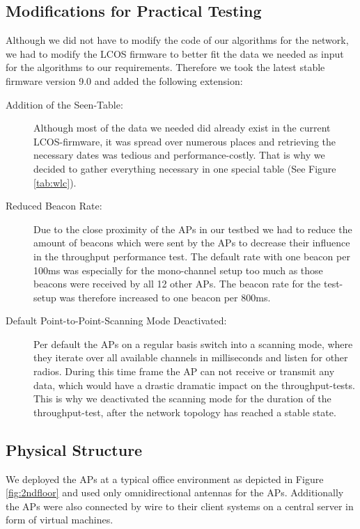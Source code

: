     \subsection{Modifications for Practical Testing}
      Although we did not have to modify the code of our algorithms for the network, we had to modify the \ac{LCOS} firmware to better fit the 
      data we needed as input for the algorithms to our requirements. Therefore we took the latest stable firmware version 9.0 and added the following extension:
      \begin{description}
	\item[Addition of the Seen-Table:]
	  Although most of the data we needed did already exist in the current \ac{LCOS}-firmware, it was spread over numerous places and retrieving the necessary dates
	  was tedious and performance-costly. That is why we decided to gather everything necessary in one special table (See Figure \ref{tab:wlc}).
	\item[Reduced Beacon Rate:]
	  Due to the close proximity of the APs in our testbed we had to reduce the amount of beacons which were sent by the APs to decrease their influence in 
	  the throughput performance test. The default rate with one beacon per 100ms was especially for the mono-channel setup too much as those beacons were received
	  by all 12 other APs. The beacon rate for the test-setup was therefore increased to one beacon per 800ms.
	\item[Default Point-to-Point-Scanning Mode Deactivated:]
	  Per default the APs on a regular basis switch into a scanning mode, where they iterate over all available channels in milliseconds and listen for
	  other radios. During this time frame the AP can not receive or transmit any data, which would have a drastic dramatic impact on the throughput-tests.
	  This is why we deactivated the scanning mode for the duration of the throughput-test, after the network topology has reached a stable state.
      \end{description}
   
\newpage
   
    \subsection{Physical Structure}
      We deployed the APs at a typical office environment as depicted in Figure \ref{fig:2ndfloor} and used only omnidirectional antennas for the APs.
      Additionally the APs were also connected by wire to their client systems on a central server in form of virtual machines.
      
